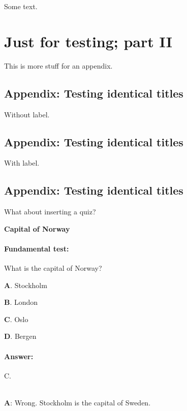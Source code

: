 \n\documentclass[%
oneside,                 %
final,                   %
10pt]{article}
\newenvironment{doconcequiz}{}{}
\newcounter{doconcequizcounter}
\theoremstyle{definition}
\begin{document}
\begin{enumerate}
Some text.

\section{Just for testing; part II}
\label{app2}

This is more stuff for an appendix.

\subsection{Appendix: Testing identical titles}

Without label.

\subsection{Appendix: Testing identical titles}
\label{test:title:id1}

With label.

\subsection{Appendix: Testing identical titles}
\label{test:title:id2}

What about inserting a quiz?


\begin{doconcequiz}
\label{quiz:2}


\noindent\textbf{\large Capital of Norway}
\paragraph{Fundamental test:}
What is the capital of Norway?

\vspace{2mm}

\textbf{A}. 
Stockholm

\textbf{B}. 
London

\textbf{C}. 
Oslo

\textbf{D}. 
Bergen


\paragraph{Answer:} C.

\\


\textbf{A}: Wrong. Stockholm is the capital of Sweden.


\end{doconcequiz}
\end{enumerate}
\end{document}
